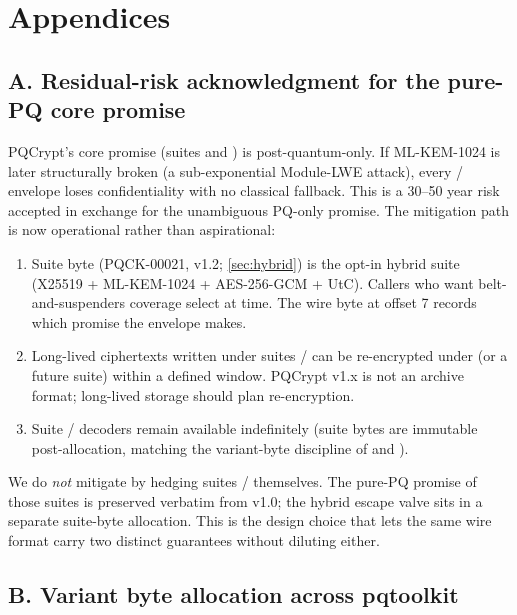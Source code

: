 \section{Appendices}
\label{sec:appendices}

\subsection*{A. Residual-risk acknowledgment for the pure-PQ core promise}

PQCrypt's core promise (suites  and ) is post-quantum-only. If ML-KEM-1024 is later structurally broken (a sub-exponential Module-LWE attack), every / envelope loses confidentiality with no classical fallback. This is a 30--50 year risk accepted in exchange for the unambiguous PQ-only promise. The mitigation path is now operational rather than aspirational:

\begin{enumerate}
\item Suite byte  (PQCK-00021, v1.2; \cref{sec:hybrid}) is the opt-in hybrid suite (X25519 + ML-KEM-1024 + AES-256-GCM + UtC). Callers who want belt-and-suspenders coverage select  at  time. The wire byte at offset 7 records which promise the envelope makes.
\item Long-lived ciphertexts written under suites / can be re-encrypted under  (or a future suite) within a defined window. PQCrypt v1.x is not an archive format; long-lived storage should plan re-encryption.
\item Suite / decoders remain available indefinitely (suite bytes are immutable post-allocation, matching the variant-byte discipline of \pqid{} and \pqhash{}).
\end{enumerate}

We do \emph{not} mitigate by hedging suites / themselves. The pure-PQ promise of those suites is preserved verbatim from v1.0; the hybrid escape valve sits in a separate suite-byte allocation. This is the design choice that lets the same wire format carry two distinct guarantees without diluting either.

\subsection*{B. Variant byte allocation across pqtoolkit}

